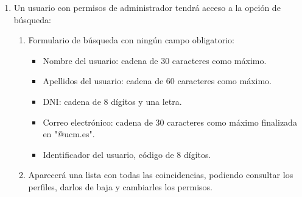 \documentclass{article}
\begin{document}
\begin{enumerate}[label=\textbf{SGU-RF(\arabic*)}, labelwidth=25mm, labelsep=2mm, itemindent=0mm, leftmargin=*, align=parleft]
            \item Un usuario con permisos de administrador tendrá acceso a la opción de búsqueda:
            \begin{adjustwidth}{15mm}{0mm}
                \begin{enumerate}[label=\textbf{SGU-RF(2.\arabic*)}]
                    \item Formulario de búsqueda con ningún campo obligatorio:
                        \begin{itemize}
                            \item Nombre del usuario: cadena de 30 caracteres como máximo.
                            \item Apellidos del usuario: cadena de 60 caracteres como máximo.
                            \item DNI: cadena de 8 dígitos y una letra.
                            \item Correo electrónico: cadena de 30 caracteres como máximo finalizada en "@ucm.es".
                            \item Identificador del usuario, código de 8 dígitos.
                        \end{itemize}
                    \item Aparecerá una lista con todas las coincidencias, podiendo consultar los perfiles, darlos de baja y cambiarles los permisos.
                \end{enumerate}
            \end{adjustwidth}
        \end{enumerate}
\end{document}

